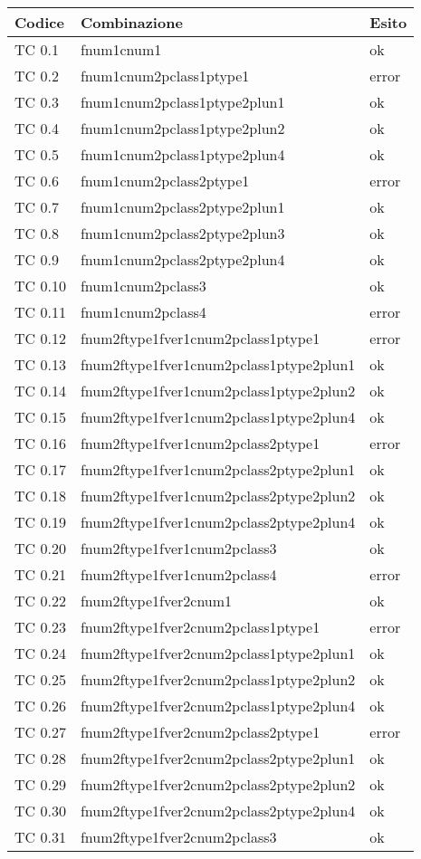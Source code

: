 \vspace{1cm}

\begin{longtable}{|p{3cm}|p{7cm}|p{3cm}|}
	\hline
	\rowcolor{Gray}
	\textbf{Codice} & \textbf{Combinazione} & \textbf{Esito}\tabularnewline
	\hline
	TC 0.1			& fnum1cnum1					& ok \tabularnewline
	\hline
	TC 0.2			& fnum1cnum2pclass1ptype1			& error \tabularnewline
	\hline
	TC 0.3			& fnum1cnum2pclass1ptype2plun1			& ok \tabularnewline
	\hline
	TC 0.4			& fnum1cnum2pclass1ptype2plun2			& ok \tabularnewline
	\hline
	TC 0.5			& fnum1cnum2pclass1ptype2plun4			& ok \tabularnewline
	\hline
	TC 0.6			& fnum1cnum2pclass2ptype1			& error \tabularnewline
	\hline
	TC 0.7			& fnum1cnum2pclass2ptype2plun1			& ok \tabularnewline
	\hline
	TC 0.8			& fnum1cnum2pclass2ptype2plun3			& ok \tabularnewline
	\hline
	TC 0.9			& fnum1cnum2pclass2ptype2plun4			& ok \tabularnewline
	\hline
	TC 0.10			& fnum1cnum2pclass3				& ok \tabularnewline
	\hline
	TC 0.11			& fnum1cnum2pclass4				& error \tabularnewline
	\hline
	TC 0.12			& fnum2ftype1fver1cnum2pclass1ptype1		& error \tabularnewline
	\hline
	TC 0.13			& fnum2ftype1fver1cnum2pclass1ptype2plun1	& ok \tabularnewline
	\hline
	TC 0.14			& fnum2ftype1fver1cnum2pclass1ptype2plun2	& ok \tabularnewline
	\hline
	TC 0.15			& fnum2ftype1fver1cnum2pclass1ptype2plun4	& ok \tabularnewline
	\hline
	TC 0.16			& fnum2ftype1fver1cnum2pclass2ptype1		& error \tabularnewline
	\hline
	TC 0.17			& fnum2ftype1fver1cnum2pclass2ptype2plun1	& ok \tabularnewline
	\hline
	TC 0.18			& fnum2ftype1fver1cnum2pclass2ptype2plun2	& ok \tabularnewline
	\hline
	TC 0.19			& fnum2ftype1fver1cnum2pclass2ptype2plun4	& ok \tabularnewline
	\hline
	TC 0.20			& fnum2ftype1fver1cnum2pclass3			& ok \tabularnewline
	\hline
	TC 0.21			& fnum2ftype1fver1cnum2pclass4			& error \tabularnewline
	\hline
	TC 0.22			& fnum2ftype1fver2cnum1				& ok \tabularnewline
	\hline
	TC 0.23			& fnum2ftype1fver2cnum2pclass1ptype1		& error \tabularnewline
	\hline
	TC 0.24			& fnum2ftype1fver2cnum2pclass1ptype2plun1	& ok \tabularnewline
	\hline
	TC 0.25			& fnum2ftype1fver2cnum2pclass1ptype2plun2	& ok \tabularnewline
	\hline
	TC 0.26			& fnum2ftype1fver2cnum2pclass1ptype2plun4	& ok \tabularnewline
	\hline
	TC 0.27			& fnum2ftype1fver2cnum2pclass2ptype1		& error \tabularnewline
	\hline
	TC 0.28			& fnum2ftype1fver2cnum2pclass2ptype2plun1	& ok \tabularnewline
	\hline
	TC 0.29			& fnum2ftype1fver2cnum2pclass2ptype2plun2	& ok \tabularnewline
	\hline
	TC 0.30			& fnum2ftype1fver2cnum2pclass2ptype2plun4	& ok \tabularnewline
	\hline
	TC 0.31			& fnum2ftype1fver2cnum2pclass3			& ok \tabularnewline

\end{longtable}
